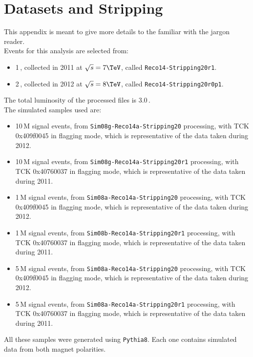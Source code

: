 
\chapter{Datasets and Stripping}
\label{AppendixC}
This appendix is meant to give more details to the familiar with the \lhcb jargon reader.\\
 
\noindent Events for this analysis are selected from:
\begin{itemize}
\item 1\,\invfb, collected in 2011 at $\sqrt{s}=7\TeV$, called \texttt{Reco14-Stripping20r1}.
\item 2\,\invfb, collected in 2012 at $\sqrt{s}=8\TeV$, called \texttt{Reco14-Stripping20r0p1}.
\end{itemize}
The total luminosity of the processed files is 3.0\,\invfb.\\

\noindent The simulated samples used are:

\begin{itemize}

\item %
10\,M \BsJpsiKst signal events, from \texttt{Sim08g-Reco14a-Stripping20} processing, with TCK 0x409f0045 in flagging mode, which is representative of the data taken during 2012.  

\item %
10\,M \BsJpsiKst signal events, from \texttt{Sim08g-Reco14a-Stripping20r1} processing, with TCK 0x40760037 in flagging mode, which is representative of the data taken during 2011.  

\item %
1\,M \BdJpsiKst signal events, from \texttt{Sim08a-Reco14a-Stripping20} processing, with TCK 0x409f0045 in flagging mode, which is representative of the data taken during 2012.  

\item %
1\,M \BdJpsiKst signal events, from \texttt{Sim08b-Reco14a-Stripping20r1} processing, with TCK 0x40760037 in flagging mode, which is representative of the data taken during 2011.    

\item %
5\,M \BsJpsiPhi signal events, from \texttt{Sim08a-Reco14a-Stripping20} processing, with TCK 0x409f0045 in flagging mode, which is representative of the data taken during 2012.  

\item %
5\,M \BsJpsiPhi signal events, from \texttt{Sim08a-Reco14a-Stripping20r1} processing, with TCK 0x40760037 in flagging mode, which is representative of the data taken during 2011.

\end{itemize}
All these samples were generated using \texttt{Pythia8}. Each one contains simulated data from both magnet polarities.\\

